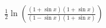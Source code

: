 \documentclass[preview]{standalone}
\begin{document}
\begin{align*}
\frac{1}{2} \ln \left( \frac{(1 + \sin{x})(1 + \sin{x})}{(1 - \sin{x})(1 + \sin{x})} \right)
\end{align*}
\end{document}
